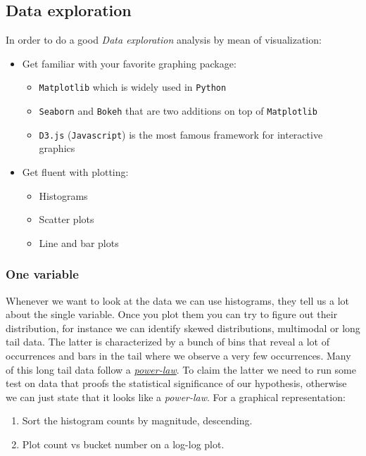 \subsection{Data exploration}

In order to do a good \emph{Data exploration} analysis by mean of visualization:

\begin{itemize}
\item {Get familiar with your favorite graphing package:}
\begin{itemize}
\item \texttt{Matplotlib} which is widely used in \texttt{Python}
\item \texttt{Seaborn} and \texttt{Bokeh} that are two additions on top of \texttt{Matplotlib}
\item \texttt{D3.js} (\texttt{Javascript}) is the most famous framework for interactive graphics
\end{itemize}
\item {Get fluent with plotting:}
\begin{itemize}
\item Histograms
\item Scatter plots
\item Line and bar plots
\end{itemize}
\end{itemize} 

\subsubsection{One variable}

Whenever we want to look at the data we can use histograms, they tell us a lot about the single variable. Once you plot them you can try to figure out their distribution, for instance we can identify skewed distributions, multimodal or long tail data. The latter is characterized by a bunch of bins that reveal a lot of occurrences and bars in the tail where we observe a very few occurrences. Many of this long tail data follow a \href{https://en.wikipedia.org/wiki/Power\_law\#Power-law\_probability\_distributions}{\emph{power-law}}. To claim the latter we need to run some test on data that proofs the statistical significance of our hypothesis, otherwise we can just state that it looks like a \emph{power-law}. For a graphical representation:

\begin{enumerate}
\item Sort the histogram counts by magnitude, descending.
\item Plot count vs bucket number on a log-log plot.
\end{enumerate}


